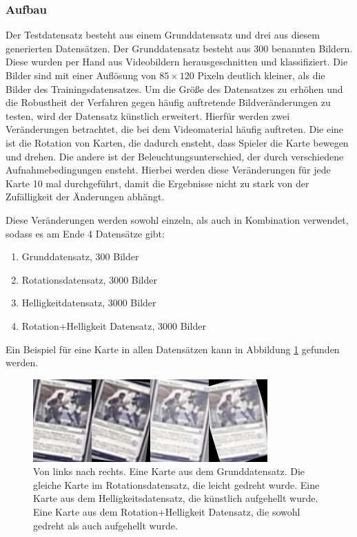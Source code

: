 \subsubsection{Aufbau}
\label{sub:aufbau}

Der Testdatensatz besteht aus einem Grunddatensatz und drei aus diesem generierten Datensätzen.
Der Grunddatensatz besteht aus 300 benannten Bildern. Diese wurden per Hand aus Videobildern herausgeschnitten und klassifiziert. Die Bilder sind mit einer Auflösung von $85 \times 120$ Pixeln deutlich kleiner, als die Bilder des Trainingsdatensatzes.
Um die Größe des Datensatzes zu erhöhen und die Robustheit der Verfahren gegen häufig auftretende Bildveränderungen zu testen, wird der Datensatz künstlich erweitert.
Hierfür werden zwei Veränderungen betrachtet, die bei dem Videomaterial häufig auftreten.
Die eine ist die Rotation von Karten, die dadurch ensteht, dass Spieler die Karte bewegen und drehen. Die andere ist der Beleuchtungsunterschied, der durch verschiedene Aufnahmebedingungen ensteht. Hierbei werden diese Veränderungen für jede Karte 10 mal durchgeführt, damit die Ergebnisse nicht zu stark von der Zufälligkeit der Änderungen abhängt.

Diese Veränderungen werden sowohl einzeln, als auch in Kombination verwendet, sodass es am Ende 4 Datensätze gibt:

\begin{enumerate}
\item Grunddatensatz, 300 Bilder
\item Rotationsdatensatz, 3000 Bilder
\item Helligkeitdatensatz, 3000 Bilder
\item Rotation+Helligkeit Datensatz, 3000 Bilder
\end{enumerate}

Ein Beispiel für eine Karte in allen Datensätzen kann in Abbildung \ref{fig:testSet} gefunden werden.

\begin{figure}[h]
    \centering
		\includegraphics[scale=1.0]{bilder/testSet.png}
    	\caption{Von links nach rechts. Eine Karte aus dem Grunddatensatz. Die gleiche Karte im Rotationsdatensatz, die leicht gedreht wurde. Eine Karte aus dem Helligkeitsdatensatz, die künstlich aufgehellt wurde. Eine Karte aus dem Rotation+Helligkeit Datensatz, die sowohl gedreht als auch aufgehellt wurde.}
    	\label{fig:testSet}
\end{figure}

